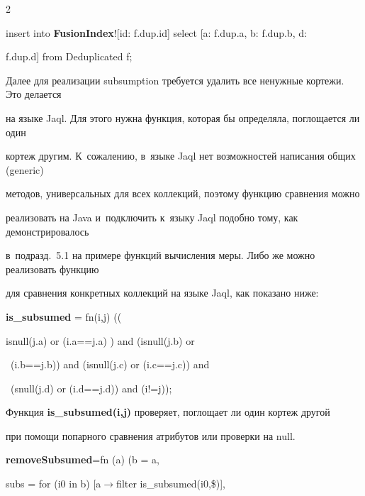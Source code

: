 \begin{multicols}{2}
{\noindent

  insert into {\textbf{FusionIndex}}![id: f.dup.id] select [a: f.dup.a, b: f.dup.b, d:

f.dup.d] from Deduplicated f;

}



  Далее для реализации subsumption требуется удалить все ненужные кортежи. Это делается

на языке Jaql. Для этого нужна функция, которая бы определяла, поглощается ли один

кортеж другим. К~сожалению, в~языке Jaql нет возможностей написания общих (generic)

методов, универсальных для всех коллекций, поэтому функцию сравнения можно

реализовать на Java и~подключить к~языку Jaql подобно тому, как демонстрировалось

в~подразд.~5.1 на примере функций вычисления меры. Либо же можно реализовать функцию

для сравнения конкретных коллекций на языке Jaql, как показано ниже:



{\sf

 \noindent

{\textbf{is\_subsumed}} = fn(i,j) ((





 \noindent isnull(j.a) or (i.a\;==\;j.a) ) and (isnull(j.b) or



 \noindent

 \ (i.b\;==\;j.b))  and (isnull(j.c) or (i.c\;==\;j.c)) and



 \noindent

 \ (snull(j.d) or (i.d\;==\;j.d)) and (i!\;=\;j));

  }



  Функция \textbf{is\_subsumed(i,j)} проверяет, поглощает ли один кортеж другой

при помощи попарного сравнения атрибутов или проверки на null.



{\sf \noindent

{\textbf{removeSubsumed}}\;=\;fn (a) (b = a,



\noindent

  subs = for (i0 in b) [a\;$\to$\;filter is\_subsumed(i0,\$)],



}
\end{multicols}

